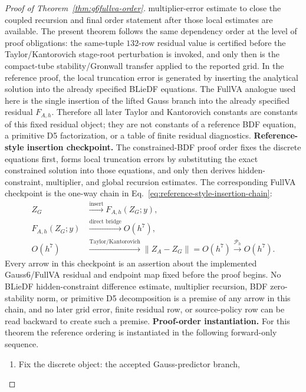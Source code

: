 \documentclass[preprint,12pt]{elsarticle}
\begin{document}
\begin{proof}[Proof of Theorem~\ref{thm:g6fullva-order}]
multiplier-error estimate to close the coupled recursion and final order
statement after those local estimates are available.  The present
theorem follows the same dependency order at the level of proof obligations:
the same-tuple \(132\)-row residual value is certified before the
Taylor/Kantorovich stage-root perturbation is invoked, and only then is the
compact-tube stability/Gronwall transfer applied to the reported grid.
In the reference proof, the local truncation error is generated by inserting
the analytical solution into the already specified BLieDF equations.  The
FullVA analogue used here is the single insertion of the lifted Gauss branch
into the already specified residual \(F_{A,h}\).  Therefore all later Taylor
and Kantorovich constants are constants of this fixed residual object; they
are not constants of a reference BDF equation, a primitive D5 factorization,
or a table of finite residual diagnostics.
\noindent\textbf{Reference-style insertion checkpoint.}
The constrained-BDF proof order fixes the discrete equations first, forms
local truncation errors by substituting the exact constrained solution into
those equations, and only then derives hidden-constraint, multiplier, and
global recursion estimates.  The corresponding FullVA checkpoint is the
one-way chain in Eq.~\eqref{eq:reference-style-insertion-chain}:
\begin{equation}
\label{eq:reference-style-insertion-chain}
\begin{aligned}
  Z_G &\xrightarrow{\text{insert}} F_{A,h}(Z_G;y),\\
  F_{A,h}(Z_G;y) &\xrightarrow{\text{direct bridge}} O(h^7),\\
  O(h^7) &\xrightarrow{\text{Taylor/Kantorovich}}
    \|Z_A-Z_G\|=O(h^7)
    \xrightarrow{\mathcal P_h} O(h^7).
\end{aligned}
\end{equation}
Every arrow in this checkpoint is an assertion about the implemented
Gauss6/FullVA residual and endpoint map fixed before the proof begins.  No
BLieDF hidden-constraint difference estimate, multiplier recursion,
BDF zero-stability norm, or primitive D5 decomposition is a premise of any
arrow in this chain, and no later grid error, finite residual row, or
source-policy row can be read backward to create such a premise.
\noindent\textbf{Proof-order instantiation.}
For this theorem the reference ordering is instantiated in the following
forward-only sequence.
\begin{enumerate}
  \item Fix the discrete object: the accepted Gauss-predictor branch,

\end{enumerate}
\end{proof}
\end{document}
